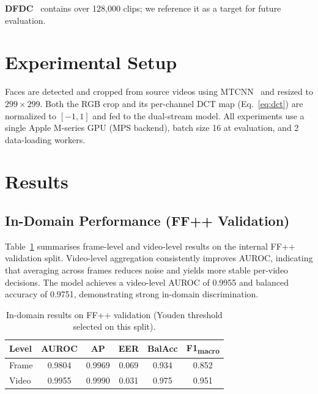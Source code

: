 \documentclass[conference]{IEEEtran}
\begin{document}
\textbf{DFDC}~\cite{dolhansky2020dfdc} contains over 128,000 clips; we reference it as a target for future evaluation.

\section{Experimental Setup}

Faces are detected and cropped from source videos using MTCNN~\cite{zhang2016mtcnn} and resized to $299\times299$.
Both the RGB crop and its per-channel DCT map (Eq.~\ref{eq:dct}) are normalized to $[-1,1]$ and fed to the dual-stream model.
All experiments use a single Apple M-series GPU (MPS backend), batch size 16 at evaluation, and 2 data-loading workers.

\section{Results}

\subsection{In-Domain Performance (FF++ Validation)}
Table~\ref{tab:main_ffpp} summarises frame-level and video-level results on the internal FF++ validation split.
Video-level aggregation consistently improves AUROC, indicating that averaging across frames reduces noise and yields more stable per-video decisions.
The model achieves a video-level AUROC of 0.9955 and balanced accuracy of 0.9751, demonstrating strong in-domain discrimination.

\begin{table}[t]
\centering
\caption{In-domain results on FF++ validation (Youden threshold selected on this split).}
\label{tab:main_ffpp}
\begin{tabular}{lccccc}
\toprule
\textbf{Level} & \textbf{AUROC} & \textbf{AP} & \textbf{EER} & \textbf{BalAcc} & \textbf{F1\textsubscript{macro}} \\
\midrule
Frame & 0.9804 & 0.9969 & 0.069 & 0.934 & 0.852 \\
Video & 0.9955 & 0.9990 & 0.031 & 0.975 & 0.951 \\
\bottomrule
\end{tabular}
\end{table}
\end{document}
